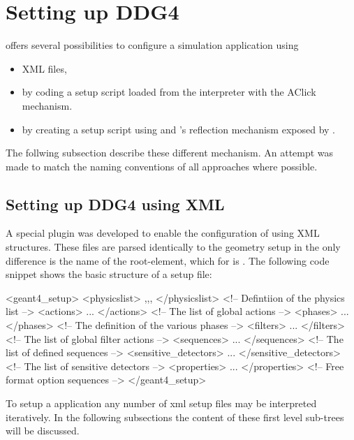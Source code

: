 \documentclass[10pt,a4paper]{article}
\begin{document}
\newpage
\section{Setting up DDG4}
\label{sec:ddg4-implementation-setup}

\noindent
\DDG offers several possibilities to configure a simulation application
using
\begin{itemize}\itemcompact
\item XML files,
\item by coding a setup script loaded from the  interpreter 
	with the AClick	mechanism.
\item by creating a setup script using  and 
	's reflection mechanism exposed by .
\end{itemize}
The follwing subsection describe these different mechanism. An attempt was made 
to match the naming conventions of all approaches where possible.

\subsection{Setting up DDG4 using XML}
\label{sec:ddg4-implementation-setup-xml}

\noindent
A special plugin was developed to enable the configuration of \DDG using
XML structures. These files are parsed identically to the geometry setup
in \DDhep the only difference is the name of the root-element, which for 
\DDG is . 
The following code snippet shows the basic structure of a \DDG setup file:
\begin{unnumberedcode}
<geant4_setup>
  <physicslist>          ,,,  </physicslist>  <!-- Defintiion of the physics list          -->
  <actions>              ...  </actions>      <!-- The list of global actions              -->
  <phases>               ...  </phases>       <!-- The definition of the various phases    -->
  <filters>              ...  </filters>      <!-- The list of global filter actions       -->
  <sequences>            ...  </sequences>    <!-- The list of defined sequences           -->
  <sensitive_detectors>  ...  </sensitive_detectors>  <!-- The list of sensitive detectors -->
  <properties>           ...  </properties>   <!-- Free format option sequences            -->
</geant4_setup>
\end{unnumberedcode}
To setup a  application any number of xml setup files may be interpreted 
iteratively. In the following subsections the content of these first level sub-trees will
be discussed.
\end{document}
